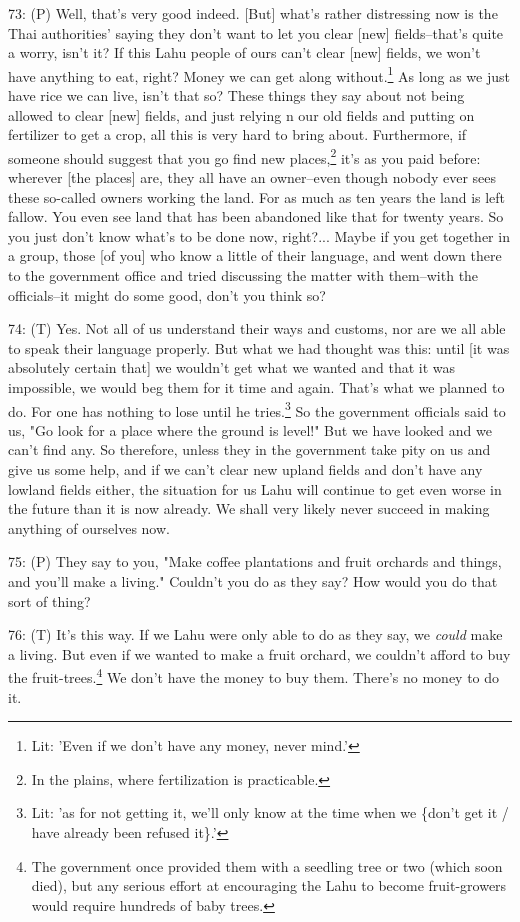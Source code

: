 73: (P) Well, that's very good indeed. [But] what's rather distressing now is the
Thai authorities' saying they don't want to let you clear [new] fields--that's
quite a worry, isn't it? If this Lahu people of ours can't clear [new] fields,
we won't have anything to eat, right? Money we can get along without.\footnote{Lit: 'Even if we don't have any money, never mind.'} As long
as we just have rice we can live, isn't that so? These things they say about not
being allowed to clear [new] fields, and just relying n our old fields and putting
on fertilizer to get a crop, all this is very hard to bring about. Furthermore,
if someone should suggest that you go find new places,\footnote{In the plains, where fertilization is practicable.} it's as you paid before:
wherever [the places] are, they all have an owner--even though nobody ever sees
these so-called owners working the land. For as much as ten years the land is left
fallow. You even see land that has been abandoned like that for twenty years. So
you just don't know what's to be done now, right?... Maybe if you get together
in a group, those [of you] who know a little of their language, and went down there
to the government office and tried discussing the matter with them--with the officials--it
might do some good, don't you think so?

74: (T) Yes. Not all of us understand their ways and customs, nor are we all able
to speak their language properly. But what we had thought was this: until [it was
absolutely certain that] we wouldn't get what we wanted and that it was impossible,
we would beg them for it time and again. That's what we planned to do. For one
has nothing to lose until he tries.\footnote{Lit: 'as for not getting it, we'll only know at the time when we \{don't get it / have already been refused it\}.'} So the government officials said to us,
"Go look for a place where the ground is level!" But we have
looked and we can't find any. So therefore, unless they in the government take
pity on us and give us some help, and if we can't clear new upland fields and don't
have any lowland fields either, the situation for us Lahu will continue to get
even worse in the future than it is now already. We shall very likely never succeed
in making anything of ourselves now.

75: (P) They say to you, "Make coffee plantations and fruit orchards and
things, and you'll make a living." Couldn't you do as they say? How would
you do that sort of thing?

76: (T) It's this way. If we Lahu were only able to do as they say, we \textit{could}
make a living. But even if we wanted to make a fruit orchard, we couldn't afford
to buy the fruit-trees.\footnote{The government once provided them with a seedling tree or two (which soon died), but any serious effort at encouraging the Lahu to become fruit-growers would require hundreds of baby trees.} We don't have the money to buy them. There's no money
to do it.

